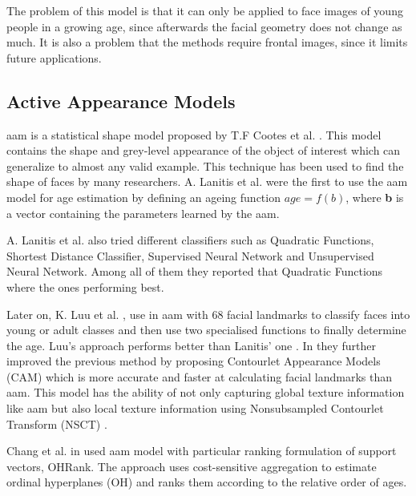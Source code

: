 The problem of this model is that it can only be applied to face images of young people in a growing age, since afterwards the facial geometry does not change as much. It is also a problem that the methods require frontal images, since it limits future applications.

\subsection{Active Appearance Models}\label{subsec:AAM}

\gls{aam} is a statistical shape model proposed by T.F Cootes et al. \cite{Cootes:2001:AAM:378040.378090}. This model contains the shape and grey-level appearance of the object of interest which can generalize to almost any valid example. This technique has been used to find the shape of faces by many researchers. A. Lanitis et al. \cite{791208} \cite{993553} \cite{Lanitis:2004:CDC:2225304.2226166} were the first to use the \gls{aam} model for age estimation by defining an ageing function $age=f(b)$, where \textbf{b} is a vector containing the parameters learned by the \gls{aam}.

A. Lanitis et al. \cite{Lanitis:2004:CDC:2225304.2226166} also tried different classifiers such as Quadratic Functions, Shortest Distance Classifier, Supervised Neural Network and Unsupervised Neural Network. Among all of them they reported that Quadratic Functions where the ones performing best.

Later on, K. Luu et al. \cite{Luu:2009:AEU:1736406.1736456, LuuSSBS11}, use in \cite{Luu:2009:AEU:1736406.1736456} \gls{aam} with 68 facial landmarks to classify faces into young or adult classes and then use two specialised functions to finally determine the age. Luu's approach performs better than Lanitis' one \cite{Lanitis:2004:CDC:2225304.2226166}. In \cite{LuuSSBS11} they further improved the previous method by proposing Contourlet Appearance Models (CAM) which is more accurate and faster at calculating facial landmarks than \gls{aam}. This model has the ability of not only capturing global texture information like \gls{aam} but also local texture information using Nonsubsampled Contourlet Transform (NSCT) \cite{1703596}.

Chang et al. in \cite{5995437} used \gls{aam} model with particular ranking formulation of support vectors, OHRank. The approach uses cost-sensitive aggregation to estimate ordinal hyperplanes (OH) and ranks them according to the relative order of ages.

